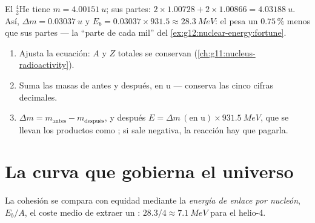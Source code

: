 \begin{example}[Helio-4]\label{ex:g12:nuclear-energy:helium}
El  ${}^{4}_{2}\mathrm{He}$ tiene $m = \qty{4.00151}{u}$; sus partes:
$2 \times 1.00728 + 2 \times 1.00866 = \qty{4.03188}{u}$. Así,
$\Delta m = \qty{0.03037}{u}$ y $E_b = 0.03037 \times 931.5 \approx \qty{28.3}{MeV}$:
el  pesa un $0.75\,\%$ menos que sus partes --- la ``parte de cada mil'' del
\cref{ex:g12:nuclear-energy:fortune}.
\end{example}

\begin{method}\label{met:g12:nuclear-energy:balance}
\begin{enumerate}
  \item Ajusta la ecuación: $A$ y $Z$ totales se conservan
        (\cref{ch:g11:nucleus-radioactivity}).
  \item Suma las masas de antes y después, en \unit{u} --- conserva las cinco cifras
        decimales.
  \item $\Delta m = m_{\text{antes}} - m_{\text{después}}$, y después
        $E = \Delta m\,(\text{en u}) \times \qty{931.5}{MeV}$, que se llevan los
        productos como ; si sale negativa, la reacción hay que
        pagarla.
\end{enumerate}
\end{method}

\section{La curva que gobierna el universo}

\begin{definition}\label{def:g12:nuclear-energy:pernucleon}
La cohesión se compara con equidad mediante la \emph{energía de enlace por
nucleón}, $E_b/A$, el coste medio de extraer un
: $28.3/4 \approx \qty{7.1}{MeV}$ para el helio-4.
\end{definition}

